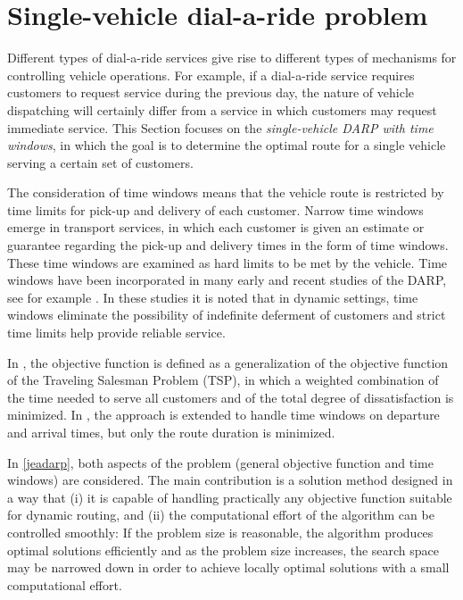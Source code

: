 \documentclass[dissertation,draft*]{aaltoseries}
\begin{document}
\section{Single-vehicle dial-a-ride problem}
\label{singlevehicle}
Different types of dial-a-ride services give rise to
different types of mechanisms for controlling vehicle operations. 
For example, if a dial-a-ride service requires customers to request 
service during the previous day, the nature of vehicle
dispatching will certainly differ from a service in which
customers may request immediate service.
This Section focuses on %
the \emph{single-vehicle DARP with time windows}, in which the goal is to determine the optimal
route for a single vehicle serving a certain set of customers.

The consideration of time windows means that the vehicle route is 
restricted by time limits for pick-up and delivery of each customer.
Narrow time windows emerge in transport services, in which each customer
is given an estimate or guarantee regarding the pick-up and delivery times in the 
form of time windows. These time windows are examined as hard limits to be met by the vehicle.
Time windows have been incorporated in many early and recent studies of the DARP, see for example 
\cite{psaraftis02, jaw, madsen, toth02,cordeau02,diana, wong, cordeau01, berbegliafeas}.
In these studies it is noted that in dynamic settings, time windows eliminate the possibility of indefinite
deferment of customers and strict time limits help provide reliable service.

In \cite{psaraftis01}, the objective function is defined as a
generalization of the objective function of the Traveling Salesman Problem (TSP), 
in which a weighted combination
of the time needed to serve all customers and of the total degree of dissatisfaction
is minimized.
In \cite{psaraftis02}, the approach is extended to handle time windows on departure and arrival times,
but only the route duration is minimized. 

In \ref{jeadarp}, both aspects of the problem (general objective function and time windows)
are considered. The main contribution is a solution method designed in a way that (i) it is capable of
handling practically any objective function suitable for dynamic routing, and (ii) the computational
effort of the algorithm can be controlled smoothly: If the problem size is reasonable, 
the algorithm produces optimal solutions efficiently and as the problem size increases,
the search space may be narrowed down in order to achieve locally optimal solutions with a small computational effort.
\end{document}
